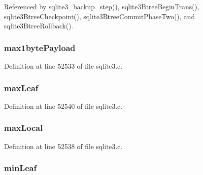 Referenced by sqlite3\+\_\+backup\+\_\+step(), sqlite3\+Btree\+Begin\+Trans(), sqlite3\+Btree\+Checkpoint(), sqlite3\+Btree\+Commit\+Phase\+Two(), and sqlite3\+Btree\+Rollback().

\hypertarget{struct_bt_shared_ae108776c319d9bbb89d5f8ededa5635b}{}
\subsubsection[{max1byte\+Payload}]{ max1byte\+Payload}\label{struct_bt_shared_ae108776c319d9bbb89d5f8ededa5635b}


Definition at line 52533 of file sqlite3.\+c.

\hypertarget{struct_bt_shared_aaeea9c389ead7c7a046429260b2dcdea}{}
\subsubsection[{max\+Leaf}]{ max\+Leaf}\label{struct_bt_shared_aaeea9c389ead7c7a046429260b2dcdea}


Definition at line 52540 of file sqlite3.\+c.

\hypertarget{struct_bt_shared_ae520370dc0940464a186684b0a9b5113}{}
\subsubsection[{max\+Local}]{ max\+Local}\label{struct_bt_shared_ae520370dc0940464a186684b0a9b5113}


Definition at line 52538 of file sqlite3.\+c.

\hypertarget{struct_bt_shared_aaab9580fd37da2518624d11a6b0fa3dd}{}
\subsubsection[{min\+Leaf}]{ min\+Leaf}\label{struct_bt_shared_aaab9580fd37da2518624d11a6b0fa3dd}


